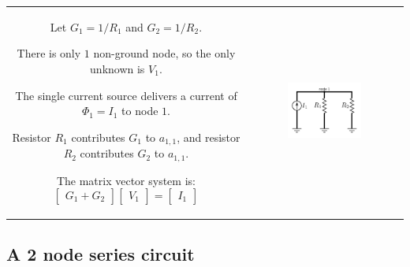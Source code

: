 \documentclass{article}
\begin{document}
\begin{tabular}{cc}
\parbox{0.5\textwidth}{
Let \(G_1 = 1/R_1\) and \(G_2 = 1/R_2\). 

There is only \(1\) non-ground node, so the only unknown is \(V_1\). 

The single current source delivers a current of \(\Phi_1 = I_1\) to node \(1\). 

Resistor \(R_1\) contributes \(G_1\) to \(a_{1,1}\), and resistor \(R_2\) contributes \(G_2\) to \(a_{1,1}\).

The matrix vector system is:  
\[\begin{bmatrix} G_1 + G_2 \end{bmatrix}\begin{bmatrix} V_1 \end{bmatrix} = \begin{bmatrix} I_1 \end{bmatrix}\]
} & \parbox{0.5\textwidth}{
\includegraphics[width = 0.5\textwidth]{simplest_circuit_2}
}
\end{tabular}



\subsection{A 2 node series circuit}
\end{document}
